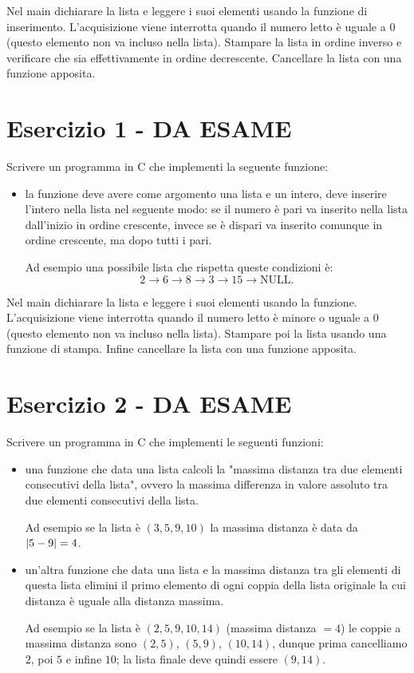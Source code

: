 \documentclass[italian,oneside,headinclude,10pt]{scrartcl}
\DeclarePairedDelimiter{\abs}{\lvert}{\rvert}
\begin{document}
Nel main dichiarare la lista e leggere i suoi elementi usando la funzione di inserimento. L'acquisizione viene interrotta quando il numero letto è uguale a $0$ (questo elemento non va incluso nella lista). Stampare la lista in ordine inverso e verificare che sia effettivamente in ordine decrescente. Cancellare la lista con una funzione apposita.




\section{Esercizio 1 - DA ESAME}

Scrivere un programma in C che implementi la seguente funzione:
\begin{itemize}
    \item la funzione deve avere come argomento una lista e un intero, deve inserire l'intero nella lista nel seguente modo: se il numero è pari va inserito nella lista dall'inizio in ordine crescente, invece se è dispari va inserito comunque in ordine crescente, ma dopo tutti i pari.
    
    Ad esempio una possibile lista che rispetta queste condizioni è: \[
        2 \to 6 \to 8 \to 3 \to 15 \to \text{NULL}.    
    \]
\end{itemize}

Nel main dichiarare la lista e leggere i suoi elementi usando la funzione. L'acquisizione viene interrotta quando il numero letto è minore o uguale a $0$ (questo elemento non va incluso nella lista). Stampare poi la lista usando una funzione di stampa. Infine cancellare la lista con una funzione apposita.

\section{Esercizio 2 - DA ESAME}

Scrivere un programma in C che implementi le seguenti funzioni:
\begin{itemize}
    \item una funzione che data una lista calcoli la "massima distanza tra due elementi consecutivi della lista", ovvero la massima differenza in valore assoluto tra due elementi consecutivi della lista.
    
    Ad esempio se la lista è $(3, 5, 9, 10)$ la massima distanza è data da $\abs*{5 - 9} = 4$.
    \item un'altra funzione che data una lista e la massima distanza tra gli elementi di questa lista elimini il primo elemento di ogni coppia della lista originale la cui distanza è uguale alla distanza massima.
    
    Ad esempio se la lista è $(2, 5, 9, 10, 14)$ (massima distanza $= 4$) le coppie a massima distanza sono $(2, 5)$, $(5, 9)$, $(10, 14)$, dunque prima cancelliamo $2$, poi $5$ e infine $10$; la lista finale deve quindi essere $(9, 14)$.
\end{itemize}
\end{document}
